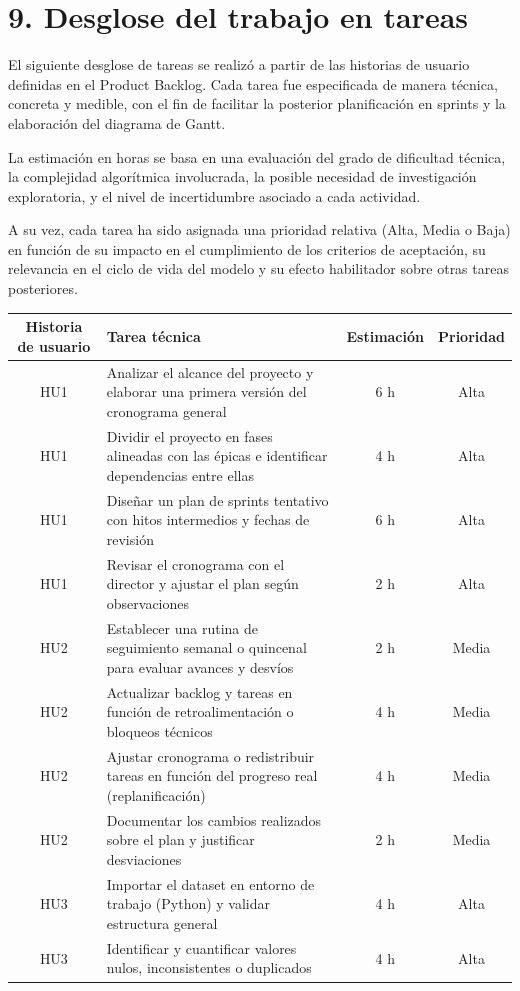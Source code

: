 \documentclass[
11pt, %
]{charter}
\begin{document}
\section{9. Desglose del trabajo en tareas}
\label{sec:wbs}

El siguiente desglose de tareas se realizó a partir de las historias de usuario definidas en el Product Backlog. Cada tarea fue especificada de manera técnica, concreta y medible, con el fin de facilitar la posterior planificación en sprints y la elaboración del diagrama de Gantt.

La estimación en horas se basa en una evaluación del grado de dificultad técnica, la complejidad algorítmica involucrada, la posible necesidad de investigación exploratoria, y el nivel de incertidumbre asociado a cada actividad.

A su vez, cada tarea ha sido asignada una prioridad relativa (Alta, Media o Baja) en función de su impacto en el cumplimiento de los criterios de aceptación, su relevancia en el ciclo de vida del modelo y su efecto habilitador sobre otras tareas posteriores.

\begin{table}[htpb]
\centering
\begin{tabularx}{\linewidth}{@{}|c|X|c|c|@{}}
\hline
\rowcolor[HTML]{C0C0C0}
Historia de usuario & Tarea técnica & Estimación & Prioridad \\ \hline

HU1 & Analizar el alcance del proyecto y elaborar una primera versión del cronograma general & 6 h & Alta \\ \hline
HU1 & Dividir el proyecto en fases alineadas con las épicas e identificar dependencias entre ellas & 4 h & Alta \\ \hline
HU1 & Diseñar un plan de sprints tentativo con hitos intermedios y fechas de revisión & 6 h & Alta \\ \hline
HU1 & Revisar el cronograma con el director y ajustar el plan según observaciones & 2 h & Alta \\ \hline

HU2 & Establecer una rutina de seguimiento semanal o quincenal para evaluar avances y desvíos & 2 h & Media \\ \hline
HU2 & Actualizar backlog y tareas en función de retroalimentación o bloqueos técnicos & 4 h & Media \\ \hline
HU2 & Ajustar cronograma o redistribuir tareas en función del progreso real (replanificación) & 4 h & Media \\ \hline
HU2 & Documentar los cambios realizados sobre el plan y justificar desviaciones & 2 h & Media \\ \hline

HU3 & Importar el dataset en entorno de trabajo (Python) y validar estructura general & 4 h & Alta \\ \hline
HU3 & Identificar y cuantificar valores nulos, inconsistentes o duplicados & 4 h & Alta \\ \hline

\end{tabularx}
\end{table}
\end{document}
